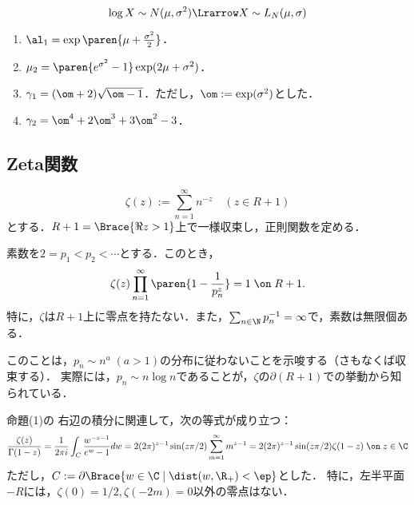\documentclass[uplatex,dvipdfmx]{jsreport}
\begin{document}
\begin{proposition}
    \[\log X\sim N(\mu,\sigma^2)\Lrarrow X\sim L_N(\mu,\sigma)\]
\end{proposition}

\begin{proposition}\mbox{}
    \begin{enumerate}
        \item $\al_1=\exp\paren{\mu+\frac{\sigma^2}{2}}$．
        \item $\mu_2=\paren{e^{\sigma^2}-1}\exp(2\mu+\sigma^2)$．
        \item $\gamma_1=(\om+2)\sqrt{\om-1}$．ただし，$\om:=\exp(\sigma^2)$とした．
        \item $\gamma_2=\om^4+2\om^3+3\om^2-3$．
    \end{enumerate}
\end{proposition}

\subsection{Zeta関数}

\begin{proposition}[Zeta関数の定義]
    \[\zeta(z):=\sum^\infty_{n=1}n^{-z}\quad(z\in R+1)\]
    とする．$R+1=\Brace{\Re z>1}$上で一様収束し，正則関数を定める．
\end{proposition}

\begin{theorem}[Euler積表示]
    素数を$2=p_1<p_2<\cdots$とする．このとき，
    \[\zeta(z)\prod^\infty_{n=1}\paren{1-\frac{1}{p_n^z}}=1\;\on\;R+1.\]
    特に，$\zeta$は$R+1$上に零点を持たない．また，$\sum_{n\in\N}p^{-1}_n=\infty$で，素数は無限個ある．
\end{theorem}
\begin{remarks}
    このことは，$p_n\sim n^a\;(a>1)$の分布に従わないことを示唆する（さもなくば収束する）．
    実際には，$p_n\sim n\log n$であることが，$\zeta$の$\partial(R+1)$での挙動から知られている．
\end{remarks}

\begin{lemma}
    命題(1)の
    右辺の積分に関連して，次の等式が成り立つ：
    \[\frac{\zeta(z)}{\Gamma(1-z)}=\frac{1}{2\pi i}\int_C\frac{w^{-z-1}}{e^{w}-1}dw=2(2\pi)^{z-1}\sin(z\pi/2)\sum_{m=1}^\infty m^{z-1}=2(2\pi)^{z-1}\sin(z\pi/2)\zeta(1-z)\;\on\; z\in\C\]
    ただし，$C:=\partial\Brace{w\in\C\mid\dist(w,\R_+)<\ep}$とした．
    特に，左半平面$-R$には，$\zeta(0)=1/2,\zeta(-2m)=0$以外の零点はない．
\end{lemma}
\end{document}

